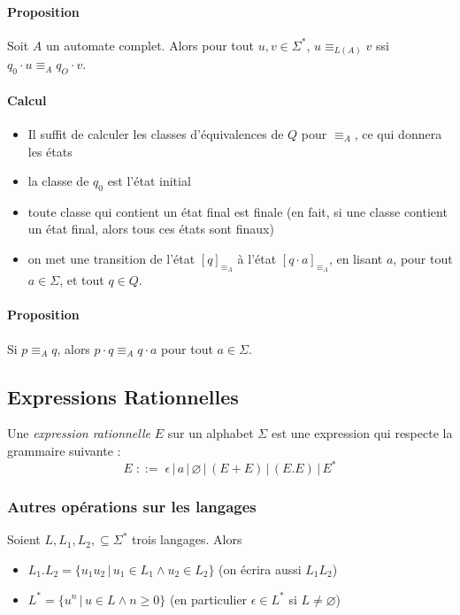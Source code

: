 \documentclass[a4paper]{article}
\begin{document}
  \paragraph{Proposition} Soit $A$ un automate complet. Alors pour tout 
$u,v \in \Sigma^*$,
  $u \equiv_{L(A)} v$ ssi $q_0 \cdot u \equiv_A q_O \cdot v$.

  \paragraph{Calcul}
  \begin{itemize}
    \item Il suffit de calculer les classes d'équivalences de $Q$ pour 
$\equiv_A$, 
    ce qui donnera les états
    \item la classe de $q_0$ est l'état initial
    \item toute classe qui contient un état final est finale (en fait, 
si une classe
    contient un état final, alors tous ces états sont finaux)
    \item on met une transition de l'état $[q]_{\equiv_A}$ à l'état $[q 
\cdot a]_{\equiv_A}$,
    en lisant $a$, pour tout $a \in \Sigma$, et tout $q \in Q$.
  \end{itemize}
  
  \paragraph{Proposition} Si $p \equiv_A q$, alors $p \cdot q \equiv_A q 
\cdot a$ pour tout $a \in \Sigma$.


  \subsection{Expressions Rationnelles}
  Une \textit{expression rationnelle} $E$ sur un alphabet $\Sigma$ est 
une expression
  qui respecte la grammaire suivante :
  $$ E\; ::=\; \epsilon\,|\, a\,|\,\varnothing\,|\, (E+E)\,|\, (E.E) 
\,|\, E^* $$

  \subsubsection{Autres opérations sur les langages}
  Soient $L, L_1, L_2, \subseteq \Sigma^*$ trois langages. Alors
  \begin{itemize}
    \item $L_1.L_2 = \{u_1u_2\, |\, u_1 \in L_1 \land u_2 \in L_2\}$ (on 
écrira aussi $L_1L_2$)
    \item $L^* = \{u^n\, |\, u \in L \land n \geq 0\}$ (en particulier 
$\epsilon \in L^*$ si $L \neq \varnothing$)
  \end{itemize}
\end{document}
